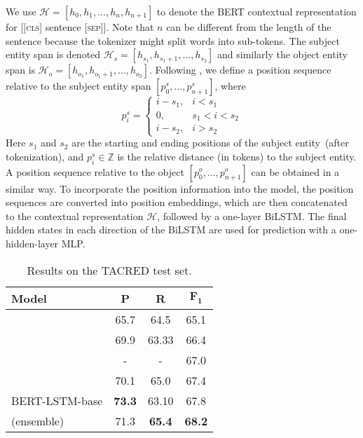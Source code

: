 \documentclass[11pt,a4paper]{article}
\begin{document}
We use $\mathcal{H} = [h_0, h_1, ..., h_n, h_{n+1}]$ to denote the BERT contextual representation for [[\textsc{cls}] sentence [\textsc{sep}]]. 
Note that $n$ can be different from the length of the sentence because the tokenizer might split words into sub-tokens. 
The subject entity span is denoted $\mathcal{H}_s = [h_{s_1}, h_{s_1 + 1}, ..., h_{s_2}]$ and similarly the object entity span is $\mathcal{H}_o = [h_{o_1}, h_{o_1+1}, ..., h_{o_2}]$. 
Following \citet{zhang2017position}, we define a position sequence relative to the subject entity span $[p_0^s, ..., p_{n+1}^s]$, where
\begin{equation}
	p_i^s =
		\begin{cases}
			i-s_1,      &  i < s_1\\
			0, &  s_1 < i < s_2 \\
			i-s_2, & i > s_2
		\end{cases}
\end{equation}
Here $s_1$ and $s_2$ are the starting and ending positions of the subject entity~(after tokenization), 
and $p_i^s \in \mathbb{Z}$ is the relative distance (in tokens) to the subject entity. 
A position sequence relative to the object $[p_0^o, ..., p_{n+1}^o]$ can be obtained in a similar way. 
To incorporate the position information into the model, the position sequences are converted into position embeddings, 
which are then concatenated to the contextual representation $\mathcal{H}$, followed by a one-layer BiLSTM. 
The final hidden states in each direction of the BiLSTM are used for prediction with a one-hidden-layer MLP. 


\begin{table}[t]
	\centering
	\small
	\begin{tabular}{l@{\qquad}ccc}
		\toprule
		\textbf{Model}         & \textbf{P} & \textbf{R} & $\mathbf{F_1}$ \\ \midrule
		\citet{zhang2017position} &  65.7 & 64.5 & 65.1 \\ 
		\citet{zhang2018graph} & 69.9  & 63.33   &  66.4 \\
		\citet{wu2019simplifying} &  - & - & 67.0 \\ 
		\citet{alt2018improving} & 70.1 & 65.0 & 67.4 \\ \midrule
		BERT-LSTM-base & \textbf{73.3} & 63.10 & 67.8 \\  \midrule
		\citet{zhang2018graph} (ensemble) & 71.3 & \textbf{65.4} & \textbf{68.2} \\
		\bottomrule
	\end{tabular}
	\caption{Results on the \textsc{TACRED} test set.}
	\label{res:rel_tacred}
\end{table}
\end{document}
